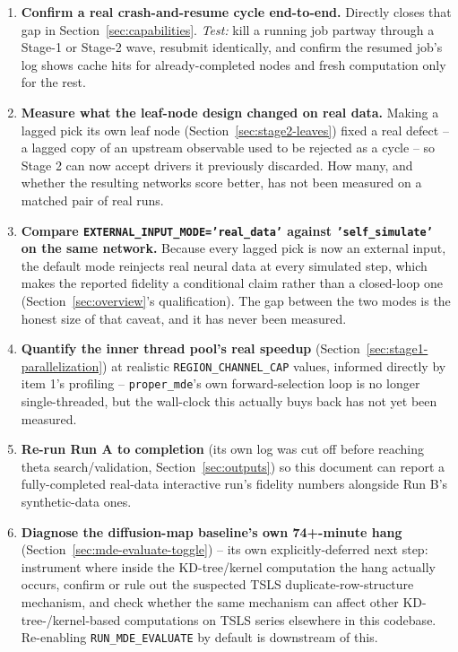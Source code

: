 \documentclass[11pt]{article}
\begin{document}
\begin{enumerate}[leftmargin=1.4em]
  \item \textbf{Confirm a real crash-and-resume cycle end-to-end.} Directly closes that gap in Section~\ref{sec:capabilities}. \emph{Test:} kill a running job partway through a Stage-1 or Stage-2 wave, resubmit identically, and confirm the resumed job's log shows cache hits for already-completed nodes and fresh computation only for the rest.
  \item \textbf{Measure what the leaf-node design changed on real data.} Making a lagged pick its own leaf node (Section~\ref{sec:stage2-leaves}) fixed a real defect -- a lagged copy of an upstream observable used to be rejected as a cycle -- so Stage 2 can now accept drivers it previously discarded. How many, and whether the resulting networks score better, has not been measured on a matched pair of real runs.
  \item \textbf{Compare \texttt{EXTERNAL\_INPUT\_MODE='real\_data'} against \texttt{'self\_simulate'} on the same network.} Because every lagged pick is now an external input, the default mode reinjects real neural data at every simulated step, which makes the reported fidelity a conditional claim rather than a closed-loop one (Section~\ref{sec:overview}'s qualification). The gap between the two modes is the honest size of that caveat, and it has never been measured.
  \item \textbf{Quantify the inner thread pool's real speedup} (Section~\ref{sec:stage1-parallelization}) at realistic \texttt{REGION\_CHANNEL\_CAP} values, informed directly by item 1's profiling -- \texttt{proper\_mde}'s own forward-selection loop is no longer single-threaded, but the wall-clock this actually buys back has not yet been measured.
  \item \textbf{Re-run Run A to completion} (its own log was cut off before reaching theta search/validation, Section~\ref{sec:outputs}) so this document can report a fully-completed real-data interactive run's fidelity numbers alongside Run B's synthetic-data ones.
  \item \textbf{Diagnose the diffusion-map baseline's own 74+-minute hang} (Section~\ref{sec:mde-evaluate-toggle}) -- its own explicitly-deferred next step: instrument where inside the KD-tree/kernel computation the hang actually occurs, confirm or rule out the suspected TSLS duplicate-row-structure mechanism, and check whether the same mechanism can affect other KD-tree-/kernel-based computations on TSLS series elsewhere in this codebase. Re-enabling \texttt{RUN\_MDE\_EVALUATE} by default is downstream of this.

\end{enumerate}
\end{document}
